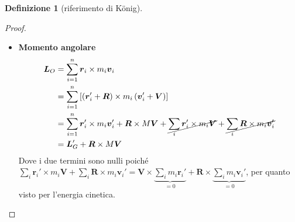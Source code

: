\documentclass[a4paper,10pt]{article}
\theoremstyle{definition}
\newcommand{\bv}{\boldsymbol} %
\theoremstyle{indentdefinition}
\newtheorem{defn}{Definizione}[section]
\theoremstyle{indenttheorem}
\theoremstyle{myremark}
\theoremstyle{indentgeneral}
\begin{document}
\begin{defn}[riferimento di König]
\begin{proof}
\begin{itemize}
\begin{align*}
T &=\frac{1}{2}\sum_{i=1}^{n}m_{i}\boldsymbol{v}_{i}\cdot\boldsymbol{v}_{i} \\
&=\frac{1}{2}\sum_{i=1}^{n}m_{i}\left(\boldsymbol{v}'_{i}+\boldsymbol{V}\right)^{2} \\
&=\frac{1}{2}\sum_{i=1}^{n}m_{i}\left(\boldsymbol{v}'_{i}\right)^{2}+\frac{1}{2}M\boldsymbol{V}^{2}+\overset{\star}{\boxed{\cancel{\sum_{i=1}^{n}m_{i}\boldsymbol{v}'_{i}\cdot\boldsymbol{V}}}} \\
&=T'\frac{1}{2}M\boldsymbol{v}_{G}^{2}\\
\end{align*}
$$\star=\sum_{i=1}^{n}m_{i}\boldsymbol{v}'_{i}\cdot\boldsymbol{V}=\frac{d}{dt}\left({\sum_{i=1}^{n}m_{i}\boldsymbol{r}'_{i}}\right)\cdot\boldsymbol{V}=\left(\textcolor{red}{\sum_{i=1}^nm_i}\right)\frac{d}{dt}\left(\cancel{\frac{\sum_{i=1}^{n}m_{i}\boldsymbol{r}'_{i}}{\textcolor{red}{\sum_{i=1}^{n}m_{i}}}}\right)\cdot\boldsymbol{V}=0$$
Il valore barrato è nullo in quanto è il vettore posizione di $G$ in $\Sigma'$, ovvero $G-G=\bv{0}$. \\
Quindi 
$$T=\frac{1}{2}M\boldsymbol{v}_{G}^{2}+T'$$
dove $T'=T'=\frac{1}{2}\sum_{i=1}^{n}m_{i}\left(\boldsymbol{v}'_{i}\right)^{2}$ è l'energia cinetica di $S$ rispetto al riferimento di Konig (ovvero del centro di massa)
\item \textbf{Momento angolare}
\begin{align*}
\boldsymbol{L}_{O}&=\sum_{i=1}^{n}\boldsymbol{r}_{i}\times m_{i}\boldsymbol{v}_{i} \\
&=\sum_{i=1}^{n}\left[\left(\boldsymbol{r}'_{i}+\boldsymbol{R}\right)\times m_{i}\left(\boldsymbol{v}'_{i}+\boldsymbol{V}\right)\right]\\
&=\sum_{i=1}^{n}\boldsymbol{r}'_{i}\times m_{i}\boldsymbol{v}'_{i}+\boldsymbol{R}\times M\boldsymbol{V}+\cancel{\sum_i\bv{r}_i'\times m_i\bv{V}}+\cancel{\sum_i\bv{R}\times m_i\bv{v}_i'}\\
&=\boldsymbol{L}'_{G}+\boldsymbol{R}\times M\boldsymbol{V}
\end{align*}
Dove i due termini sono nulli poiché ${\sum_i\bv{r}_i'\times m_i\bv{V}}+{\sum_i\bv{R}\times m_i\bv{v}_i'}=\bv{V}\times\underbrace{\sum_i m_i\bv{r}_i'}_{=0}+\bv{R}\times \underbrace{\sum_i m_i\bv{v}_i'}_{=0}$, per quanto visto per l'energia cinetica.
\end{itemize}
\end{proof}

\noindent{}
\end{defn}
\end{document}

